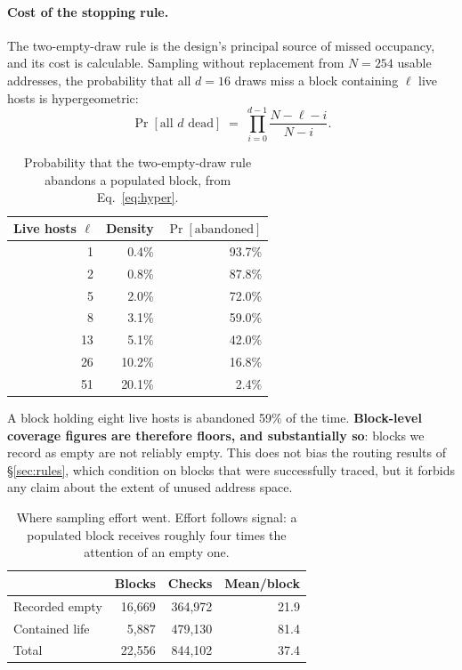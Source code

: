 \paragraph{Cost of the stopping rule.} The two-empty-draw rule is the design's principal
source of missed occupancy, and its cost is calculable. Sampling without replacement from
$N=254$ usable addresses, the probability that all $d=16$ draws miss a block containing
$\ell$ live hosts is hypergeometric:
\begin{equation}
\Pr[\text{all } d \text{ dead}] \;=\; \prod_{i=0}^{d-1} \frac{N-\ell-i}{N-i}.
\label{eq:hyper}
\end{equation}

\begin{table}[t]
\centering
\caption{Probability that the two-empty-draw rule abandons a populated block,
from Eq.~\eqref{eq:hyper}.}
\label{tab:hyper}
\begin{tabular}{rrr}
\toprule
Live hosts $\ell$ & Density & $\Pr[\text{abandoned}]$ \\
\midrule
1  & 0.4\%  & 93.7\% \\
2  & 0.8\%  & 87.8\% \\
5  & 2.0\%  & 72.0\% \\
8  & 3.1\%  & 59.0\% \\
13 & 5.1\%  & 42.0\% \\
26 & 10.2\% & 16.8\% \\
51 & 20.1\% & \phantom{0}2.4\% \\
\bottomrule
\end{tabular}
\end{table}

A block holding eight live hosts is abandoned 59\% of the time. \textbf{Block-level
coverage figures are therefore floors, and substantially so}: blocks we record as empty
are not reliably empty. This does not bias the routing results of \S\ref{sec:rules},
which condition on blocks that were successfully traced, but it forbids any claim about
the extent of unused address space.

\begin{table}[t]
\centering
\caption{Where sampling effort went. Effort follows signal: a populated block
receives roughly four times the attention of an empty one.}
\label{tab:effort}
\begin{tabular}{lrrr}
\toprule
 & Blocks & Checks & Mean/block \\
\midrule
Recorded empty & 16{,}669 & 364{,}972 & 21.9 \\
Contained life & \phantom{0}5{,}887 & 479{,}130 & 81.4 \\
\midrule
Total          & 22{,}556 & 844{,}102 & 37.4 \\
\bottomrule
\end{tabular}
\end{table}

